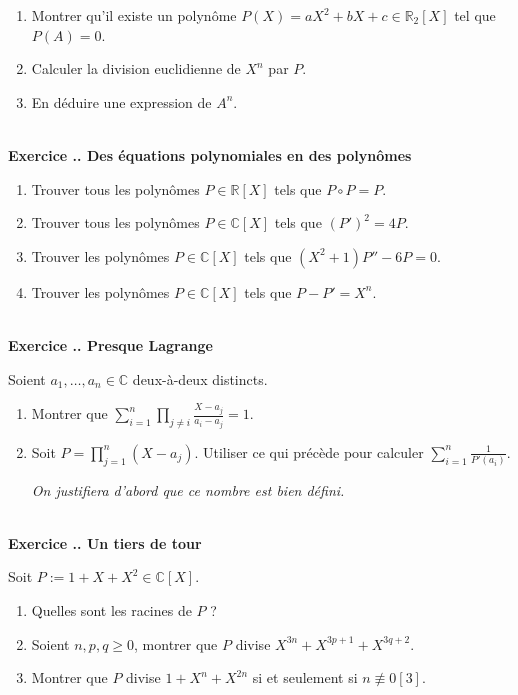 \documentclass{article}
\newcommand{\mb}[1]{\mathbb{#1}}
\newcounter{exo}
\newcommand{\exercice}[1][\null]{\textbf{\\ Exercice \thesection.\theexo. #1} \addtocounter{exo}{1}}
\begin{document}
\begin{enumerate}

\item Montrer qu'il existe un polynôme $P(X) = a X^2 + b X + c \in \mb{R}_2[X]$ tel que $P(A) = 0$.

\item Calculer la division euclidienne de $X^n$ par $P$.

\item En déduire une expression de $A^n$.

\end{enumerate}


\exercice[Des équations polynomiales en des polynômes]

\begin{enumerate}

\item Trouver tous les polynômes $P \in \mb{R}[X]$ tels que $P \circ P = P$.

\item Trouver tous les polynômes $P \in \mb{C}[X]$ tels que $(P')^2 = 4P$.

\item Trouver les polynômes $P \in \mb{C}[X]$ tels que $(X^2+1)P'' - 6P =0$.

\item Trouver les polynômes $P \in \mb{C}[X]$ tels que $P - P' = X^n$.

\end{enumerate}


\exercice[Presque Lagrange]

Soient $a_1, \dots, a_n \in \mb{C}$ deux-à-deux distincts.

\begin{enumerate}

\item Montrer que $\displaystyle \sum_{i=1}^n \prod_{j \neq i} \frac{X - a_j}{a_i - a_j} = 1$.

\item Soit $P = \prod_{j=1}^n (X-a_j)$. Utiliser ce qui précède pour calculer $\sum_{i=1}^n \frac{1}{P'(a_i)}$.

\emph{On justifiera d'abord que ce nombre est bien défini.}

\end{enumerate}



\exercice[Un tiers de tour]

Soit $P := 1 + X + X^2 \in \mb{C}[X]$.

\begin{enumerate}

\item Quelles sont les racines de $P$ ?

\item Soient $n,p,q \ge 0$, montrer que $P$ divise $X^{3n} + X^{3p+1} + X^{3q+2}$.

\item Montrer que $P$ divise $1 + X^{n} + X^{2n}$ si et seulement si $n \not \equiv 0 [3]$.

\end{enumerate}
\end{document}
